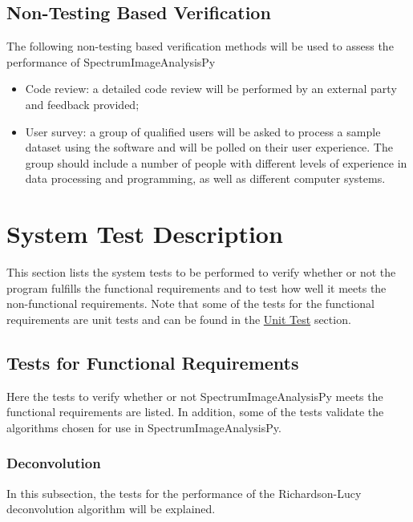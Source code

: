 \documentclass[12pt, titlepage]{article}
\newcommand{\progname}{SpectrumImageAnalysisPy}
\begin{document}
\subsection{Non-Testing Based Verification}

The following non-testing based verification methods will be used to assess the
performance of \progname{}

\begin{itemize}
	\item Code review: a detailed code review will be performed by an external
party and feedback provided;
	\item User survey: a group of qualified users will be asked to process a sample
dataset using the software and will be polled on their user experience. The
group should include a number of people with different levels of experience in
data processing and programming, as well as different computer systems.
\end{itemize}

\section{System Test Description}
\label{sec:SysTest}
This section lists the system tests to be performed to verify whether or not the
program fulfills the functional requirements and to test how well it meets the
non-functional requirements. Note that some of the tests for the functional
requirements are unit tests and can be found in the \hyperref[sec:UnitTest]{Unit
Test} section.

\subsection{Tests for Functional Requirements}
\label{subsec:FuncReqTest}
Here the tests to verify whether or not \progname{} meets the functional
requirements are listed. In addition, some of the tests validate the algorithms
chosen for use in \progname{}.

\subsubsection{Deconvolution}
In this subsection, the tests for the performance of the Richardson-Lucy
deconvolution algorithm will be explained.
\paragraph{}
\end{document}
